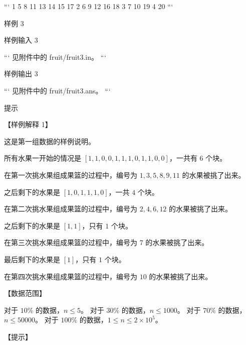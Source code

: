 \documentclass[12pt,twiside,a4paper]{ctexbook}
\numberwithin{chapter}{part}
\begin{document}
```
1 5 8 11 13 14 15 17
2 6 9 12 16 18
3 7 10 19
4 20
```

 样例 3

 样例输入 3

```
见附件中的 fruit/fruit3.in。
```

 样例输出 3

```
见附件中的 fruit/fruit3.ans。
```

 提示

【样例解释 1】

这是第一组数据的样例说明。

所有水果一开始的情况是 $[1, 1, 0, 0, 1, 1, 1, 0, 1, 1, 0, 0]$，一共有 $6$ 个块。

在第一次挑水果组成果篮的过程中，编号为 $1, 3, 5, 8, 9, 11$ 的水果被挑了出来。

之后剩下的水果是 $[1, 0, 1, 1, 1, 0]$，一共 $4$ 个块。

在第二次挑水果组成果篮的过程中，编号为 $2, 4, 6, 12$ 的水果被挑了出来。

之后剩下的水果是 $[1, 1]$，只有 $1$ 个块。

在第三次挑水果组成果篮的过程中，编号为 $7$ 的水果被挑了出来。

最后剩下的水果是 $[1]$，只有 $1$ 个块。

在第四次挑水果组成果篮的过程中，编号为 $10$ 的水果被挑了出来。

【数据范围】

对于 $10 \%$ 的数据，$n \le 5$。  
对于 $30 \%$ 的数据，$n \le 1000$。  
对于 $70 \%$ 的数据，$n \le 50000$。  
对于 $100 \%$ 的数据，$1 \le n \le 2 \times {10}^5$。

【提示】
\end{document}
